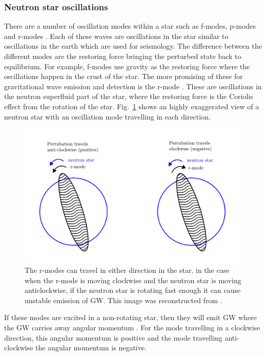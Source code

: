  \subsubsection{Neutron star oscillations}
There are a number of oscillation modes within a star such as f-modes, p-modes and r-modes \citep{becker2009NeutronStars}. 
Each of these waves are oscillations in the star similar to oscillations in the earth which are used for seismology.
The difference between the different modes are the restoring force bringing the perturbed state back to equilibrium.
For example, f-modes use gravity as the restoring force where the oscillations happen in the crust of the star.
The more promising of these for gravitational wave emission and detection is the r-mode \citep{lasky2015GravitationalWaves}. 
These are oscillations in the neutron superfluid part of the star, where the restoring force is the Coriolis effect from the rotation of the star.
Fig.~\ref{intro:source:cw:rmode} shows an highly exaggerated view of a neutron star with an oscillation mode travelling in each direction.
\begin{figure}[h]
	\centering
	\includegraphics[width=\textwidth]{C1_intro/rmode.pdf}
	\caption{The r-modes can travel in either direction in the star. in the case when the r-mode is moving clockwise and the neutron star is moving anticlockwise, if the neutron star is rotating fast enough it can cause unstable emission of \ac{GW}. This image was reconstructed from \citep{jonesCFSInstability}.}
	\label{intro:source:cw:rmode}
\end{figure}
If these modes are excited in a non-rotating star, then they will emit \ac{GW} where the \ac{GW}  carries away angular momentum \citep{jonesCFSInstability}. 
For the mode travelling in a clockwise direction, this angular momentum is positive and the mode travelling anti-clockwise the angular momentum is negative. 
